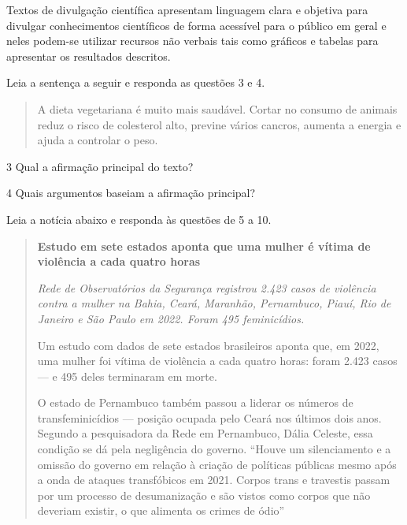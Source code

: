 
Textos de divulgação científica apresentam linguagem clara e objetiva
para divulgar conhecimentos científicos de forma acessível para o
público em geral e neles podem-se utilizar recursos não verbais tais como gráficos
e tabelas para apresentar os resultados descritos.

Leia a sentença a seguir e responda as questões 3 e 4. 

\begin{quote}

A dieta vegetariana é muito mais saudável. Cortar no consumo de animais reduz
o risco de colesterol alto, previne vários cancros, aumenta a energia e ajuda a
controlar o peso.

\end{quote}

\num{3} Qual a afirmação principal do texto?


\num{4} Quais argumentos baseiam a afirmação principal?


Leia a notícia abaixo e responda às questões de 5 a 10.

\begin{quote}

\textbf{Estudo em sete estados aponta que uma mulher é vítima de
violência a cada quatro horas}

\emph{Rede de Observatórios da Segurança registrou 2.423 casos de
violência contra a mulher na Bahia, Ceará, Maranhão, Pernambuco, Piauí,
Rio de Janeiro e São Paulo em 2022. Foram 495 feminicídios.}

Um estudo com dados de sete estados brasileiros aponta que, em 2022, uma
mulher foi vítima de violência a cada quatro horas: foram 2.423 casos
--- e 495 deles terminaram em morte.

O estado de Pernambuco também passou a liderar os números de
transfeminicídios --- posição ocupada pelo Ceará nos últimos dois
anos. Segundo a pesquisadora da Rede em Pernambuco, Dália Celeste, essa
condição se dá pela negligência do governo. ``Houve um silenciamento e a
omissão do governo em relação à criação de políticas públicas mesmo após
a onda de ataques transfóbicos em 2021. Corpos trans e travestis passam
por um processo de desumanização e são vistos como corpos que não
deveriam existir, o que alimenta os crimes de ódio'' 

\end{quote}

